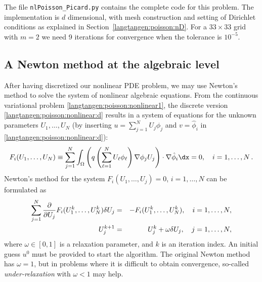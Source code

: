 The file {\fontsize{10pt}{10pt}\verb!nlPoisson_Picard.py!} contains the complete code for
this problem. The implementation is $d$ dimensional, with mesh
construction and setting of Dirichlet conditions as explained in
Section~\ref{langtangen:poisson:nD}.
For a $33\times 33$ grid with $m=2$ we need 9 iterations for convergence
when the tolerance is $10^{-5}$.

\subsection{A Newton method at the algebraic level}
\label{langtangen:nonlinear:Newton:algebraic}
\label{Newton's method}

After having discretized our nonlinear PDE problem, we may
use Newton's method to solve the system of nonlinear algebraic equations.
From the continuous variational problem \eqref{langtangen:poisson:nonlinear1},
the discrete version \eqref{langtangen:poisson:nonlinear:d} results in a
system of equations for the unknown parameters $U_1,\ldots, U_N$
(by inserting $u = \sum_{j=1}^N U_j \phi_j$ 
and $v=\hat\phi_i$ in \eqref{langtangen:poisson:nonlinear:d}):
\begin{equation}
\label{langtangen:nonlinear:Newton:F1}
F_i(U_1,\ldots,U_N) \equiv
\sum_{j=1}^N
\int_\Omega \left( q\left(\sum_{\ell=1}^NU_\ell\phi_\ell\right)
\nabla \phi_j U_j\right)\cdot \nabla \hat\phi_i\dx = 0,\quad i=1,\ldots,N\langtangenep
\end{equation}
Newton's method for the system $F_i(U_1,\ldots,U_j)=0$, $i=1,\ldots,N$
can be formulated as
\begin{eqnarray}
\sum_{j=1}^N 
{\partial \over\partial U_j} F_i(U_1^k,\ldots,U_N^k)\delta U_j
&=& -F_i(U_1^k,\ldots,U_N^k),\quad i=1,\ldots,N,\\
U_j^{k+1} &=& U_j^k + \omega\delta U_j,\quad j=1,\ldots,N,
\end{eqnarray}
where $\omega\in [0,1]$ is a relaxation parameter, and $k$ is
an iteration index. An initial guess $u^0$ must
be provided to start the algorithm.
The original Newton method has $\omega=1$, but in problems where it is
difficult to obtain convergence, so-called \emph{under-relaxation} with $\omega < 1$ may help.


